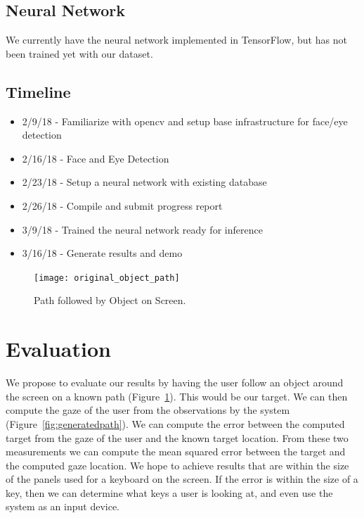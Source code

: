 \documentclass[10pt,twocolumn,letterpaper]{article}
\begin{document}
\subsection{Neural Network}
We currently have the neural network implemented in TensorFlow, but
has not been trained yet with our dataset.

\subsection{Timeline}
\begin{itemize}
  \item 2/9/18 - Familiarize with opencv and setup base infrastructure for face/eye detection
  \item 2/16/18 - Face and Eye Detection
  \item 2/23/18 - Setup a neural network with existing database
  \item 2/26/18 - Compile and submit progress report
  \item 3/9/18 - Trained the neural network ready for inference 
  \item 3/16/18 - Generate results and demo
\end{itemize}

\begin{figure}
  \begin{center}
    \texttt{[image: original\_object\_path]}
  \end{center}
  \caption{Path followed by Object on Screen.}
  \label{fig:originalpath}
\end{figure}

\section{Evaluation}
We propose to evaluate our results by having the user follow an object
around the screen on a known path (Figure~\ref{fig:originalpath}). 
This would be our target. We can then compute the gaze of the user from 
the observations by the system (Figure~\ref{fig:generatedpath}). 
We can compute the error between the computed target from the
gaze of the user and the known target location. From these two
measurements we can compute the mean squared error between the target
and the computed gaze location. We hope to achieve results that are
within the size of the panels used for a keyboard on the screen. If
the error is within the size of a key, then we can determine what keys
a user is looking at, and even use the system as an input device.
\end{document}
